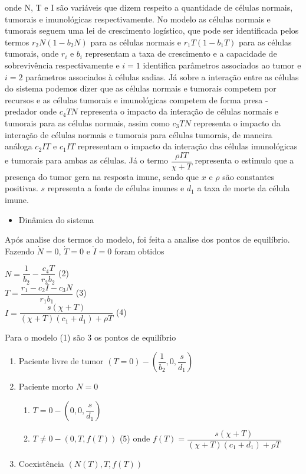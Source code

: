 \documentclass[12pt, a4paper]{article}
\begin{document}
onde N, T e I são variáveis que dizem respeito a quantidade de células normais, tumorais e imunológicas respectivamente. No modelo as células normais e tumorais seguem uma lei de crescimento logístico, que pode ser identificada pelos termos $r_2 N (1-b_2N)$ para as células normais e $r_1 T (1-b_1T)$ para as células tumorais, onde $r_i$ e $b_i$ representam a taxa de crescimento e a capacidade de sobrevivência respectivamente e $i=1$ identifica parâmetros associados ao tumor e $i=2$ parâmetros associados à células sadias. Já sobre a interação entre as células do sistema podemos dizer que as células normais e tumorais competem por recursos e as células tumorais e imunológicas competem de forma presa - predador onde $c_4 TN$ representa o impacto da interação de células normais e tumorais para as células normais, assim como $c_3 TN$ representa o impacto da interação de células normais e tumorais para células tumorais, de maneira análoga  $c_2 IT$ e $c_1 I T$ representam o impacto da interação das células imunológicas e tumorais para ambas as células. Já o termo $\dfrac{\rho I T}{\chi + T}$ representa o estimulo que a presença do tumor gera na resposta imune, sendo que $x$ e $\rho$ são constantes positivas. $s$ representa a fonte de células imunes e $d_1$ a taxa de morte da célula imune.

\begin{itemize}
\item Dinâmica do sistema
\end{itemize}

Após analise dos termos do modelo, foi feita a analise dos pontos de equilíbrio. Fazendo $\dot N = 0$, $\dot T = 0$ e $\dot I = 0$ foram obtidos 
\begin{center}
$N = \dfrac{1}{b_2} - \dfrac{c_4 T}{r_3 b_2}$ (2)\\
$T = \dfrac{r_1 - c_2 I - c_3 N}{r_1 b_1}$ (3) \\
$I = \dfrac{s(\chi + T)}{(\chi + T)(c_1 + d_1) + \rho T}$ (4)\\
\end{center}

Para o modelo (1) são 3 os pontos de equilíbrio\\

\begin{enumerate}
\item Paciente livre de tumor $(T = 0) - (\dfrac{1}{b_2}, 0, \dfrac{s}{d_1})$
\item Paciente morto $N = 0$
	\begin{enumerate}
		\item $T = 0 - (0,0, \dfrac{s}{d_1})$
		\item $T \neq 0 - (0, T, f(T))$ (5) onde $f(T) = \dfrac{s(\chi + T)}{(\chi + T)(c_1 + d_1) + \rho T}$
	\end{enumerate}
\item Coexistência $(N(T), T, f(T))$
\end{enumerate}
\end{document}
